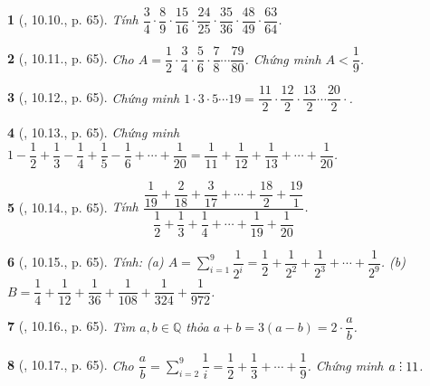 \documentclass{article}
\newtheorem{baitoan}{}
\DeclareRobustCommand{\divby}{%
	\mathrel{\vbox{\baselineskip.65ex\lineskiplimit0pt\hbox{.}\hbox{.}\hbox{.}}}%
}
\begin{document}
\begin{baitoan}[\cite{TLCT_THCS_Toan_6_so_hoc}, 10.10., p. 65]
	Tính $\dfrac{3}{4}\cdot\dfrac{8}{9}\cdot\dfrac{15}{16}\cdot\dfrac{24}{25}\cdot\dfrac{35}{36}\cdot\dfrac{48}{49}\cdot\dfrac{63}{64}$.
\end{baitoan}

\begin{baitoan}[\cite{TLCT_THCS_Toan_6_so_hoc}, 10.11., p. 65]
	Cho $A = \dfrac{1}{2}\cdot\dfrac{3}{4}\cdot\dfrac{5}{6}\cdot\dfrac{7}{8}\cdots\dfrac{79}{80}$. Chứng minh $A < \dfrac{1}{9}$.
\end{baitoan}

\begin{baitoan}[\cite{TLCT_THCS_Toan_6_so_hoc}, 10.12., p. 65]
	Chứng minh $1\cdot3\cdot5\cdots19 = \dfrac{11}{2}\cdot\dfrac{12}{2}\cdot\dfrac{13}{2}\cdots\dfrac{20}{2}\cdot$.
\end{baitoan}

\begin{baitoan}[\cite{TLCT_THCS_Toan_6_so_hoc}, 10.13., p. 65]
	Chứng minh $1 - \dfrac{1}{2} + \dfrac{1}{3} - \dfrac{1}{4} + \dfrac{1}{5} - \dfrac{1}{6} + \cdots + \dfrac{1}{20} = \dfrac{1}{11} + \dfrac{1}{12} + \dfrac{1}{13} + \cdots + \dfrac{1}{20}$.
\end{baitoan}

\begin{baitoan}[\cite{TLCT_THCS_Toan_6_so_hoc}, 10.14., p. 65]
	Tính $\dfrac{\dfrac{1}{19} + \dfrac{2}{18} + \dfrac{3}{17} + \cdots + \dfrac{18}{2} + \dfrac{19}{1}}{\dfrac{1}{2} + \dfrac{1}{3} + \dfrac{1}{4} + \cdots + \dfrac{1}{19} + \dfrac{1}{20}}$.
\end{baitoan}

\begin{baitoan}[\cite{TLCT_THCS_Toan_6_so_hoc}, 10.15., p. 65]
	Tính: (a) $A = \sum_{i=1}^9 \dfrac{1}{2^i} = \dfrac{1}{2} + \dfrac{1}{2^2} + \dfrac{1}{2^3} + \cdots + \dfrac{1}{2^9}$. (b) $B = \dfrac{1}{4} + \dfrac{1}{12} + \dfrac{1}{36} + \dfrac{1}{108} + \dfrac{1}{324} + \dfrac{1}{972}$.
\end{baitoan}

\begin{baitoan}[\cite{TLCT_THCS_Toan_6_so_hoc}, 10.16., p. 65]
	Tìm $a,b\in\mathbb{Q}$ thỏa $a + b = 3(a - b) = 2\cdot\dfrac{a}{b}$.
\end{baitoan}

\begin{baitoan}[\cite{TLCT_THCS_Toan_6_so_hoc}, 10.17., p. 65]
	Cho $\dfrac{a}{b} = \sum_{i=2}^9 \dfrac{1}{i} = \dfrac{1}{2} + \dfrac{1}{3} + \cdots + \dfrac{1}{9}$. Chứng minh $a\divby11$.
\end{baitoan}
\end{document}
